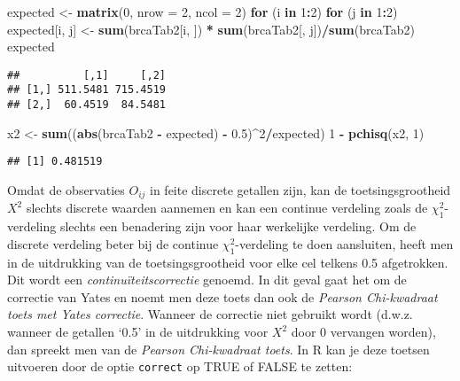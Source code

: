 \documentclass[12pt,dutch,coursenotes]{book}
\newenvironment{Shaded}{\begin{snugshade}}{\end{snugshade}}
\newcommand{\KeywordTok}[1]{\textcolor[rgb]{0.13,0.29,0.53}{\textbf{#1}}}
\newcommand{\DataTypeTok}[1]{\textcolor[rgb]{0.13,0.29,0.53}{#1}}
\newcommand{\DecValTok}[1]{\textcolor[rgb]{0.00,0.00,0.81}{#1}}
\newcommand{\FloatTok}[1]{\textcolor[rgb]{0.00,0.00,0.81}{#1}}
\newcommand{\StringTok}[1]{\textcolor[rgb]{0.31,0.60,0.02}{#1}}
\newcommand{\ControlFlowTok}[1]{\textcolor[rgb]{0.13,0.29,0.53}{\textbf{#1}}}
\newcommand{\OperatorTok}[1]{\textcolor[rgb]{0.81,0.36,0.00}{\textbf{#1}}}
\newcommand{\NormalTok}[1]{#1}
\theoremstyle{definition}
\theoremstyle{definition}
\theoremstyle{definition}
\theoremstyle{remark}
\begin{document}
\begin{Shaded}
\begin{Highlighting}[]
\NormalTok{expected <-}\StringTok{ }\KeywordTok{matrix}\NormalTok{(}\DecValTok{0}\NormalTok{, }\DataTypeTok{nrow =} \DecValTok{2}\NormalTok{, }\DataTypeTok{ncol =} \DecValTok{2}\NormalTok{)}
\ControlFlowTok{for}\NormalTok{ (i }\ControlFlowTok{in} \DecValTok{1}\OperatorTok{:}\DecValTok{2}\NormalTok{) }\ControlFlowTok{for}\NormalTok{ (j }\ControlFlowTok{in} \DecValTok{1}\OperatorTok{:}\DecValTok{2}\NormalTok{) expected[i, j] <-}\StringTok{ }\KeywordTok{sum}\NormalTok{(brcaTab2[i, }
\NormalTok{    ]) }\OperatorTok{*}\StringTok{ }\KeywordTok{sum}\NormalTok{(brcaTab2[, j])}\OperatorTok{/}\KeywordTok{sum}\NormalTok{(brcaTab2)}
\NormalTok{expected}
\end{Highlighting}
\end{Shaded}

\begin{verbatim}
##          [,1]     [,2]
## [1,] 511.5481 715.4519
## [2,]  60.4519  84.5481
\end{verbatim}

\begin{Shaded}
\begin{Highlighting}[]
\NormalTok{x2 <-}\StringTok{ }\KeywordTok{sum}\NormalTok{((}\KeywordTok{abs}\NormalTok{(brcaTab2 }\OperatorTok{-}\StringTok{ }\NormalTok{expected) }\OperatorTok{-}\StringTok{ }\FloatTok{0.5}\NormalTok{)}\OperatorTok{^}\DecValTok{2}\OperatorTok{/}\NormalTok{expected)}
\DecValTok{1} \OperatorTok{-}\StringTok{ }\KeywordTok{pchisq}\NormalTok{(x2, }\DecValTok{1}\NormalTok{)}
\end{Highlighting}
\end{Shaded}

\begin{verbatim}
## [1] 0.481519
\end{verbatim}

Omdat de observaties \(O_{ij}\) in feite discrete getallen zijn, kan de
toetsingsgrootheid \(X^2\) slechts discrete waarden aannemen en kan een
continue verdeling zoals de \(\chi^2_1\)-verdeling slechts een
benadering zijn voor haar werkelijke verdeling. Om de discrete verdeling
beter bij de continue \(\chi^2_1\)-verdeling te doen aansluiten, heeft
men in de uitdrukking van de toetsingsgrootheid voor elke cel telkens
0.5 afgetrokken. Dit wordt een \emph{continuïteitscorrectie} genoemd. In
dit geval gaat het om de correctie van Yates en noemt men deze toets dan
ook de \emph{Pearson Chi-kwadraat toets met Yates correctie}. Wanneer de
correctie niet gebruikt wordt (d.w.z. wanneer de getallen `0.5' in de
uitdrukking voor \(X^2\) door 0 vervangen worden), dan spreekt men van
de \emph{Pearson Chi-kwadraat toets}. In R kan je deze toetsen uitvoeren
door de optie \texttt{correct} op TRUE of FALSE te zetten:
\end{document}
